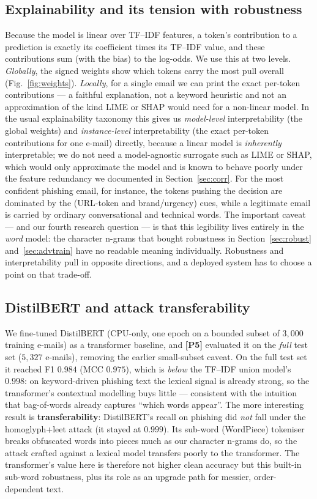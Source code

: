 \documentclass[11pt]{article}
\begin{document}
\subsection{Explainability and its tension with robustness}
\label{sec:explain}
Because the model is linear over TF--IDF features, a token's contribution to a
prediction is exactly its coefficient times its TF--IDF value, and these contributions
sum (with the bias) to the log-odds. We use this at two levels. \emph{Globally}, the
signed weights show which tokens carry the most pull overall (Fig.~\ref{fig:weights}).
\emph{Locally}, for a single email we can print the exact per-token contributions --- a
faithful explanation, not a keyword heuristic and not an approximation of the kind
LIME or SHAP would need for a non-linear model. In the usual explainability taxonomy this
gives us \emph{model-level} interpretability (the global weights) and \emph{instance-level}
interpretability (the exact per-token contributions for one e-mail) directly, because a
linear model is \emph{inherently} interpretable; we do not need a model-agnostic surrogate
such as LIME or SHAP, which would only approximate the model and is known to behave poorly
under the feature redundancy we documented in Section~\ref{sec:corr}. For the most confident phishing email,
for instance, the tokens pushing the decision are dominated by the (URL-token and
brand/urgency) cues, while a legitimate email is carried by ordinary conversational and
technical words. The important caveat --- and our fourth research question --- is that
this legibility lives entirely in the \emph{word} model: the character n-grams that
bought robustness in Section~\ref{sec:robust} and~\ref{sec:advtrain} have no readable
meaning individually. Robustness and interpretability pull in opposite directions, and
a deployed system has to choose a point on that trade-off.

\subsection{DistilBERT and attack transferability}
\label{sec:distilbert}
We fine-tuned DistilBERT (CPU-only, one epoch on a bounded subset of $3{,}000$ training
e-mails) as a transformer baseline, and \textbf{[P5]} evaluated it on the \emph{full}
test set ($5{,}327$ e-mails), removing the earlier small-subset caveat. On the full
test set it reached F1 $0.984$ (MCC $0.975$), which is \emph{below} the TF--IDF union
model's $0.998$: on keyword-driven phishing text the lexical signal is already strong,
so the transformer's contextual modelling buys little --- consistent with the intuition
that bag-of-words already captures ``which words appear''. The more interesting
result is \textbf{transferability}: DistilBERT's recall on phishing did \emph{not}
fall under the homoglyph+leet attack (it stayed at $0.999$). Its sub-word (WordPiece)
tokeniser breaks obfuscated words into pieces much as our character n-grams do, so
the attack crafted against a lexical model transfers poorly to the transformer. The
transformer's value here is therefore not higher clean accuracy but this built-in
sub-word robustness, plus its role as an upgrade path for messier, order-dependent
text.
\end{document}
